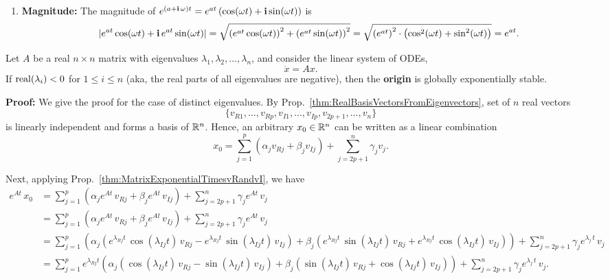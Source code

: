 \begin{enumerate}
    \item \textbf{Magnitude:} The magnitude of $e^{\left(a + \mathop{\bm{\mathrm i}} \omega \right)t} = e^{at} \left( \cos(\omega t) + \mathop{\bm{\mathrm i}} \sin(\omega t) \right)$ is 
    $$| e^{at} \cos(\omega t) + \mathop{\bm{\mathrm i}} e^{at} \sin(\omega t)| = \sqrt{ \left( e^{at} \cos(\omega t) \right)^2 + \left( e^{at} \sin(\omega t) \right)^2} = \sqrt{\left( e^{at} \right)^2 \cdot \left(\cos^2(\omega t) + \sin^2(\omega t) \right)} = e^{at}.$$
\end{enumerate}
\Qed


\bigskip
\begin{tcolorbox}[title=\textcolor{black}{Proof of Prop.~\ref{thm:ExpStabilityLinearSystems} (Exponential Stability of Linear Systems of ODEs)}, sharp corners, colback=green!30, colframe=green!80!blue, breakable, fonttitle=\bfseries]

Let $A$ be a real $n \times n$ matrix with eigenvalues $\lambda_1, \lambda_2, \ldots, \lambda_n$, and consider the linear system of ODEs,
$$\dot{x} = Ax.$$
If ${\rm real}(\lambda_i)< 0$ for $1 \le i \le n$ (aka, the real parts of all eigenvalues are negative), then the \textbf{origin} is globally exponentially stable.  
\end{tcolorbox}
\textbf{Proof:} We give the proof for the case of distinct eigenvalues.  By Prop.~\ref{thm:RealBasisVectorsFromEigenvectors}, set of $n$ real vectors
$$ \{ v_{R1}, \ldots,  v_{Rp},v_{I1}, \ldots,  v_{Ip} , v_{2p+1}, \ldots, v_n \} $$
is linearly independent and forms a basis of $\mathbb R^n$. Hence, an arbitrary $x_0 \in \mathbb R^n$ can be written as a linear combination
$$x_0 = \sum_{j=1}^p \left(\alpha_j  v_{Rj} + \beta_j v_{Ij} \right)+ \sum_{j=2p+1}^n \gamma_j v_j.$$

Next, applying Prop.~\ref{thm:MatrixExponentialTimesvRandvI}, we have
\begin{align*}
    e^{At}\, x_0 &= \sum_{j=1}^p \left(\alpha_j e^{At}\,  v_{Rj} + \beta_j e^{At}\, v_{Ij} \right)+ \sum_{j=2p+1}^n \gamma_j e^{At}\, v_j \\
    &=  \sum_{j=1}^p \left(\alpha_j e^{At}\,  v_{Rj} + \beta_j e^{At}\, v_{Ij} \right)+ \sum_{j=2p+1}^n \gamma_j e^{At}\, v_j \\
    &= \sum_{j=1}^p \left(\alpha_j \left( e^{\lambda_{Rj} t }\, \cos(\lambda_{Ij} t) \, v_{Rj}  -  e^{\lambda_{Rj}  t} \, \sin(\lambda_{Ij} t) \,v_{Ij}  \right) + \beta_j \left( e^{\lambda_{Rj}  t }\, \sin(\lambda_{Ij} t) \, v_{Rj}  +  e^{\lambda_{Rj}  t} \, \cos(\lambda_{Ij} t) \,v_{Ij} \right) \right)+ \sum_{j=2p+1}^n \gamma_j e^{\lambda_j\, t}\, v_j \\
    &= \sum_{j=1}^p e^{\lambda_{Rj} t } \left( \alpha_j \left( \cos(\lambda_{Ij} t) \, v_{Rj} - \sin(\lambda_{Ij} t) \,v_{Ij}  \right) + \beta_j \left( \sin(\lambda_{Ij} t) \, v_{Rj} + \cos(\lambda_{Ij} t) \,v_{Ij} \right) \right) + \sum_{j=2p+1}^n \gamma_j e^{\lambda_j\, t}\, v_j.
\end{align*}

